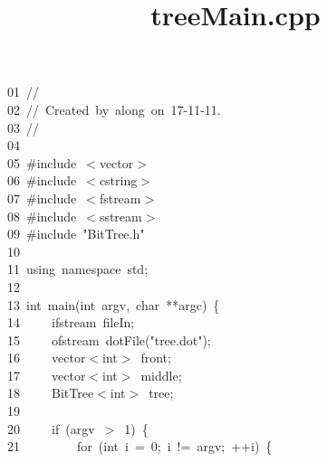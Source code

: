 \documentclass[11pt,a4paper]{ctexart}
\title{treeMain.cpp}
\newcommand{\hlstd}[1]{\textcolor[rgb]{0.2,0.2,0.2}{#1}}
\newcommand{\hlnum}[1]{\textcolor[rgb]{0.06,0.58,0.63}{#1}}
\newcommand{\hlstr}[1]{\textcolor[rgb]{0.06,0.58,0.63}{#1}}
\newcommand{\hlpps}[1]{\textcolor[rgb]{0.06,0.58,0.63}{#1}}
\newcommand{\hlslc}[1]{\textcolor[rgb]{0.59,0.59,0.59}{#1}}
\newcommand{\hlppc}[1]{\textcolor[rgb]{0.41,0.78,0.23}{#1}}
\newcommand{\hlopt}[1]{\textcolor[rgb]{0.2,0.2,0.2}{#1}}
\newcommand{\hllin}[1]{\textcolor[rgb]{0.59,0.59,0.59}{#1}}
\newcommand{\hlkwa}[1]{\textcolor[rgb]{0.23,0.42,0.78}{#1}}
\newcommand{\hlkwb}[1]{\textcolor[rgb]{0.63,0,0.31}{#1}}
\newcommand{\hlkwd}[1]{\textcolor[rgb]{0.78,0.23,0.41}{#1}}
\begin{document}
\pagecolor{bgcolor}
\noindent
\ttfamily
\hlstd{}\hllin{01\ }\hlstd{}\hlslc{//}\\
\hllin{02\ }\hlstd{}\hlslc{//\ Created\ by\ along\ on\ 17{-}11{-}11.}\\
\hllin{03\ }\hlstd{}\hlslc{//}\\
\hllin{04\ }\hlstd{}\\
\hllin{05\ }\hlstd{}\hlppc{\#include\ $<$vector$>$}\\
\hllin{06\ }\hlstd{}\hlppc{\#include\ $<$cstring$>$}\\
\hllin{07\ }\hlstd{}\hlppc{\#include\ $<$fstream$>$}\\
\hllin{08\ }\hlstd{}\hlppc{\#include\ $<$sstream$>$}\\
\hllin{09\ }\hlstd{}\hlppc{\#include\ }\hlpps{"BitTree.h"}\hlppc{}\\
\hllin{10\ }\hlstd{}\\
\hllin{11\ }\hlstd{}\hlkwa{using\ namespace\ }\hlstd{std}\hlopt{;}\\
\hllin{12\ }\hlstd{}\\
\hllin{13\ }\hlstd{}\hlkwb{int\ }\hlstd{}\hlkwd{main}\hlstd{}\hlopt{(}\hlstd{}\hlkwb{int\ }\hlstd{argv}\hlopt{,\ }\hlstd{}\hlkwb{char\ }\hlstd{}\hlopt{{*}{*}}\hlstd{argc}\hlopt{)\ \{}\\
\hllin{14\ }\hlstd{}\hlstd{\ \ \ \ }\hlstd{ifstream\ fileIn}\hlopt{;}\\
\hllin{15\ }\hlstd{}\hlstd{\ \ \ \ }\hlstd{ofstream\ }\hlkwd{dotFile}\hlstd{}\hlopt{(}\hlstd{}\hlstr{"tree.dot"}\hlstd{}\hlopt{);}\\
\hllin{16\ }\hlstd{}\hlstd{\ \ \ \ }\hlstd{vector}\hlopt{$<$}\hlstd{}\hlkwb{int}\hlstd{}\hlopt{$>$\ }\hlstd{front}\hlopt{;}\\
\hllin{17\ }\hlstd{}\hlstd{\ \ \ \ }\hlstd{vector}\hlopt{$<$}\hlstd{}\hlkwb{int}\hlstd{}\hlopt{$>$\ }\hlstd{middle}\hlopt{;}\\
\hllin{18\ }\hlstd{}\hlstd{\ \ \ \ }\hlstd{BitTree}\hlopt{$<$}\hlstd{}\hlkwb{int}\hlstd{}\hlopt{$>$\ }\hlstd{tree}\hlopt{;}\\
\hllin{19\ }\hlstd{}\\
\hllin{20\ }\hlstd{}\hlstd{\ \ \ \ }\hlstd{}\hlkwa{if\ }\hlstd{}\hlopt{(}\hlstd{argv\ }\hlopt{$>$\ }\hlstd{}\hlnum{1}\hlstd{}\hlopt{)\ \{}\\
\hllin{21\ }\hlstd{}\hlstd{\ \ \ \ \ \ \ \ }\hlstd{}\hlkwa{for\ }\hlstd{}\hlopt{(}\hlstd{}\hlkwb{int\ }\hlstd{i\ }\hlopt{=\ }\hlstd{}\hlnum{0}\hlstd{}\hlopt{;\ }\hlstd{i\ }\hlopt{!=\ }\hlstd{argv}\hlopt{;\ ++}\hlstd{i}\hlopt{)\ \{}\\
\end{document}

